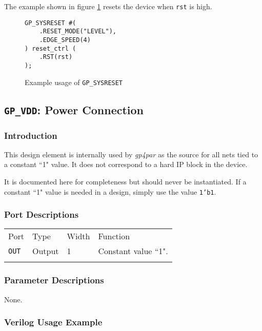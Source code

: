 \documentclass[11pt]{article}
\newcommand{\namestyle}[1]{\textit{#1}}
\newcommand{\tokenstyle}[1]{\texttt{#1}}
\newcommand{\wirestyle}[1]{\texttt{#1}}
\newcommand{\datastyle}[1]{\texttt{#1}}
\newcommand{\whenstyle}[1]{{\fontseries{sb}\selectfont#1}}
\newcommand{\thinhline}{\Xhline{1\arrayrulewidth}}
\newcommand{\thickhline}{\Xhline{2.5\arrayrulewidth}}
\begin{document}
The example shown in figure \ref{gp-sysreset-example} resets the device when \wirestyle{rst} is high.

\begin{figure}[h]
\begin{lstlisting}
GP_SYSRESET #(
	.RESET_MODE("LEVEL"),
	.EDGE_SPEED(4)
) reset_ctrl (
	.RST(rst)
);
\end{lstlisting}
\caption{Example usage of \tokenstyle{GP\_SYSRESET}}
\label{gp-sysreset-example}
\end{figure}


\FloatBarrier
\pagebreak
\subsection{\tokenstyle{GP\_VDD}: Power Connection}

\subsubsection{Introduction}
This design element is internally used by \namestyle{gp4par} as the source for all nets tied to a constant ``1" value. It does not correspond to a hard IP block in the device.

It is documented here for completeness but should never be instantiated. If a constant ``1" value is needed in a
design, simply use the value \datastyle{1'b1}.

\subsubsection{Port Descriptions}

\begin{tabularx}{\textwidth}{lllX}
\thinhline
\whenstyle{Port} & \whenstyle{Type} & \whenstyle{Width} & \whenstyle{Function} \\
\thickhline
\tokenstyle{OUT} & Output & 1 & Constant value ``1". \\
\thinhline
\end{tabularx}

\subsubsection{Parameter Descriptions}

None.

\subsubsection{Verilog Usage Example}
\end{document}
